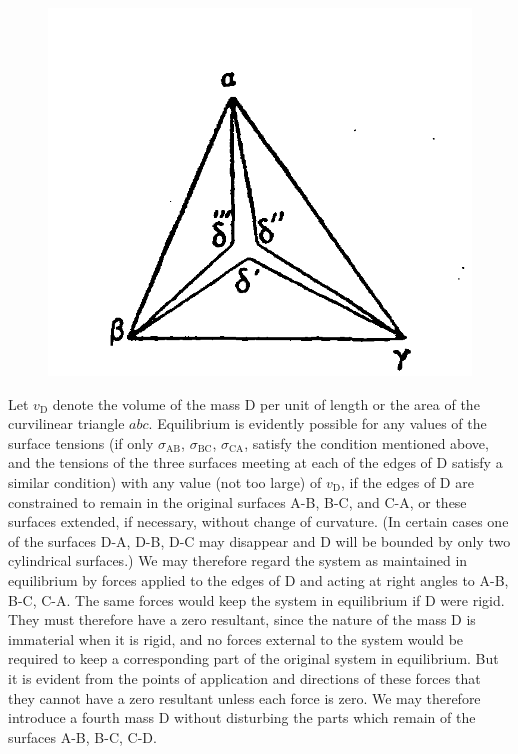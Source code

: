 \documentclass[12pt]{article}
\begin{document}
\begin{figure}
\begin{minipage}{.3\textwidth}
  \centering
  \includegraphics[width=\linewidth]{fig_16}
  \label{fig_16}
\end{minipage}
\end{figure}
Let $v_\text{D}$ denote the volume of the mass D per unit of length or the area of the curvilinear triangle $abc$. Equilibrium is evidently possible for any values of the surface tensions (if only $\sigma_{\text{AB}}$, $\sigma_{\text{BC}}$, $\sigma_{\text{CA}}$, satisfy the condition mentioned above, and the tensions of the three surfaces meeting at each of the edges of D satisfy a similar condition) with any value (not too large) of $v_\text{D}$, if the edges of D are constrained to remain in the original surfaces A-B, B-C, and C-A, or these surfaces extended, if necessary, without change of curvature. (In certain cases one of the surfaces D-A, D-B, D-C may disappear and D will be bounded by only two cylindrical surfaces.) We may therefore regard the system as maintained in equilibrium by forces applied to the edges of D and acting at right angles to A-B, B-C, C-A. The same forces would keep the system in equilibrium if D were rigid. They must therefore have a zero resultant, since the nature of the mass D is immaterial when it is rigid, and no forces external to the system would be required to keep a corresponding part of the original system in equilibrium. But it is evident from the points of application and directions of these forces that they cannot have a zero resultant unless each force is zero. We may therefore introduce a fourth mass D without disturbing the parts which remain of the surfaces A-B, B-C, C-D.
\end{document}
